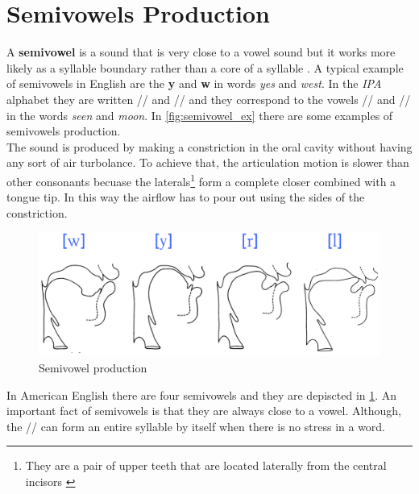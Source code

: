 
\section{Semivowels Production}
\label{sec:Semivowels Production}
A \textbf{semivowel} is a sound that is very close to a vowel sound but it works more likely as a syllable boundary rather than a core of a syllable \cite{ladefoged1998sounds}. A typical example of semivowels in English are the \textbf{y} and \textbf{w} in words \textit{yes} and \textit{west}. In the \textit{IPA} alphabet they are written // and // and they correspond to the vowels // and // in the words \textit{seen} and \textit{moon}. In \ref{fig:semivowel_ex} there are some examples of semivowels production. \\
\noindent The sound is produced by making a constriction in the oral cavity without having any sort of air turbolance. To achieve that, the articulation motion is slower than other consonants becuase the laterals\footnote{They are a pair of upper teeth that are located laterally from the central incisors \cite{laterals_wiki}} form a complete closer combined with a tongue tip. In this way the airflow has to pour out using the sides of the constriction.

\begin{figure}[!ht]
    \centering
    \includegraphics[scale=0.5]{Figures/semivowel_production.png}
    \caption{Semivowel production \cite{mit_phonetics}}
    \label{fig:semivowel_prod}
\end{figure}

\noindent In American English there are four semivowels and they are depiscted in \ref{fig:semivowel_prod}. An important fact of semivowels is that they are always close to a vowel. Although, the // can form an entire syllable by itself when there is no stress in a word.


